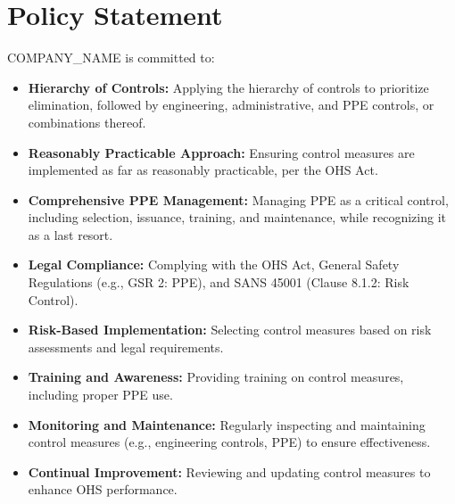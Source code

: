 \documentclass[12pt]{article}
\begin{document}
\section{Policy Statement}
{{COMPANY_NAME}} is committed to:
\begin{itemize}
    \item \textbf{Hierarchy of Controls:} Applying the hierarchy of controls to prioritize elimination, followed by engineering, administrative, and PPE controls, or combinations thereof.
    \item \textbf{Reasonably Practicable Approach:} Ensuring control measures are implemented as far as reasonably practicable, per the OHS Act.
    \item \textbf{Comprehensive PPE Management:} Managing PPE as a critical control, including selection, issuance, training, and maintenance, while recognizing it as a last resort.
    \item \textbf{Legal Compliance:} Complying with the OHS Act, General Safety Regulations (e.g., GSR 2: PPE), and SANS 45001 (Clause 8.1.2: Risk Control).
    \item \textbf{Risk-Based Implementation:} Selecting control measures based on risk assessments and legal requirements.
    \item \textbf{Training and Awareness:} Providing training on control measures, including proper PPE use.
    \item \textbf{Monitoring and Maintenance:} Regularly inspecting and maintaining control measures (e.g., engineering controls, PPE) to ensure effectiveness.
    \item \textbf{Continual Improvement:} Reviewing and updating control measures to enhance OHS performance.
\end{itemize}
\end{document}

